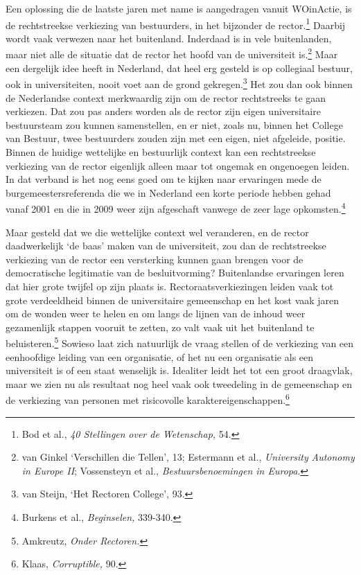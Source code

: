 \documentclass[smallauthor, chapterhaspagenum, nochapterinheader, pagenuminheader,  bigchapnum,medium2, tocpages, garamond, titleinheader]{jote-book}
\begin{document}
	Een oplossing die de laatste jaren met name is aangedragen vanuit WOinActie, is de rechtstreekse verkiezing van bestuurders, in het bijzonder de rector.\footnote{Bod et al., \emph{40 Stellingen}\emph{ over de Wetenschap}\emph{,} 54.} Daarbij wordt vaak verwezen naar het buitenland. Inderdaad is in vele buitenlanden, maar niet alle de situatie dat de rector het hoofd van de universiteit is.\footnote{van Ginkel ‘Verschillen die Tellen', 13; Estermann et al., \emph{University }\emph{Autonomy}\emph{ in Europe II}; Vossensteyn et al., \emph{Bestuursbenoemingen in Europa}.} Maar een dergelijk idee heeft in Nederland, dat heel erg gesteld is op collegiaal bestuur, ook in universiteiten, nooit voet aan de grond gekregen.\footnote{van Steijn, ‘Het Rectoren College', 93.} Het zou dan ook binnen de Nederlandse context merkwaardig zijn om de rector rechtstreeks te gaan verkiezen. Dat zou pas anders worden als de rector zijn eigen universitaire bestuursteam zou kunnen samenstellen, en er niet, zoals nu, binnen het College van Bestuur, twee bestuurders zouden zijn met een eigen, niet afgeleide, positie. Binnen de huidige wettelijke en bestuurlijk context kan een rechtstreekse verkiezing van de rector eigenlijk alleen maar tot ongemak en ongenoegen leiden. In dat verband is het nog eens goed om te kijken naar ervaringen mede de burgemeestersreferenda die we in Nederland een korte periode hebben gehad vanaf 2001 en die in 2009 weer zijn afgeschaft vanwege de zeer lage opkomsten.\footnote{Burkens et al., \emph{Beginselen,} 339-340.}



	Maar gesteld dat we die wettelijke context wel veranderen, en de rector daadwerkelijk ‘de baas' maken van de universiteit, zou dan de rechtstreekse verkiezing van de rector een versterking kunnen gaan brengen voor de democratische legitimatie van de besluitvorming? Buitenlandse ervaringen leren dat hier grote twijfel op zijn plaats is. Rectoraatsverkiezingen leiden vaak tot grote verdeeldheid binnen de universitaire gemeenschap en het kost vaak jaren om de wonden weer te helen en om langs de lijnen van de inhoud weer gezamenlijk stappen vooruit te zetten, zo valt vaak uit het buitenland te beluisteren.\footnote{Amkreutz, \emph{Onder Rectoren}\emph{.}} Sowieso laat zich natuurlijk de vraag stellen of de verkiezing van een eenhoofdige leiding van een organisatie, of het nu een organisatie als een universiteit is of een staat wenselijk is. Idealiter leidt het tot een groot draagvlak, maar we zien nu als resultaat nog heel vaak ook tweedeling in de gemeenschap en de verkiezing van personen met risicovolle karaktereigenschappen.\footnote{Klaas, \emph{Corruptible}\emph{, }90.}
\end{document}
